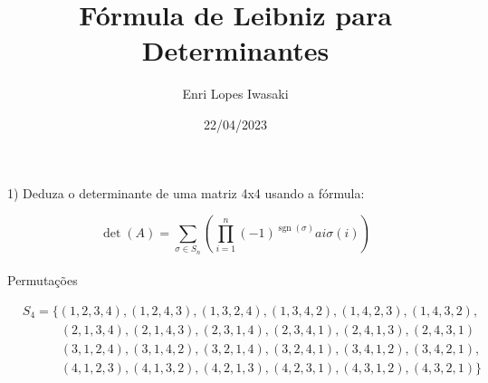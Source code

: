 \documentclass[12pt]{article}
\title{F\'{o}rmula de Leibniz para Determinantes}
\author{Enri Lopes Iwasaki}
\date{22/04/2023}
\begin{document}
\maketitle

1) Deduza o determinante de uma matriz 4x4 usando a f\'{o}rmula:  

$$\operatorname{det}(A)=\sum_{\sigma \in S_{n}}  \left(\prod_{i=1}^{n} (-1)^ {\operatorname{sgn}(\sigma)}  ai \sigma (i) \right)$$

\paragraph{}
\begin{center}
    Permuta\c{c}\~{o}es
\end{center}
$
\begin{aligned} 
    & S_{4}= {\{(1,2,3,4),(1,2,4,3),(1,3,2,4),(1,3,4,2),(1,4,2,3),(1,4,3,2),} \\ & \qquad \quad 
    (2,1,3,4),(2,1,4,3),(2,3,1,4),(2,3,4,1),(2,4,1,3),(2,4,3,1) \\ & \qquad \quad 
    (3,1,2,4),(3,1,4,2),(3,2,1,4),(3,2,4,1),(3,4,1,2),(3,4,2,1), \\ & \qquad \quad 
    (4,1,2,3),(4,1,3,2),(4,2,1,3),(4,2,3,1),(4,3,1,2),(4,3,2,1)\}
\end{aligned}
$
\end{document}
